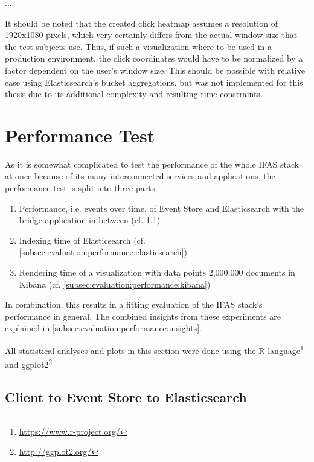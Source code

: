 ...

It should be noted that the created click heatmap assumes a resolution of 1920x1080 pixels, which very certainly differs from the actual window size that the test subjects use.
Thus, if such a visualization where to be used in a production environment, the click coordinates would have to be normalized by a factor dependent on the user's window size.
This should be possible with relative ease using Elasticsearch's bucket aggregations, but was not implemented for this thesis due to its additional complexity and resulting time constraints.



\section{Performance Test}
\label{sec:evaluation:performance}

As it is somewhat complicated to test the performance of the whole \ac{IFAS} stack at once because of its many interconnected services and applications, the performance test is split into three parts:

\begin{enumerate}
\item Performance, i.e. events over time, of Event Store and Elasticsearch with the bridge application in between (cf. \cref{subsec:evaluation:performance:evt-es-bridge})
\item Indexing time of Elasticsearch (cf. \cref{subsec:evaluation:performance:elasticsearch})
\item Rendering time of a visualization with data points 2,000,000 documents in Kibana (cf. \cref{subsec:evaluation:performance:kibana})
\end{enumerate}

In combination, this results in a fitting evaluation of the \ac{IFAS} stack's performance in general.
The combined insights from these experiments are explained in \cref{subsec:evaluation:performance:insights}.

All statistical analyses and plots in this section were done using the R language\footnote{\url{https://www.r-project.org/}} and ggplot2\footnote{\url{http://ggplot2.org/}}

\subsection{Client to Event Store to Elasticsearch}
\label{subsec:evaluation:performance:evt-es-bridge}

